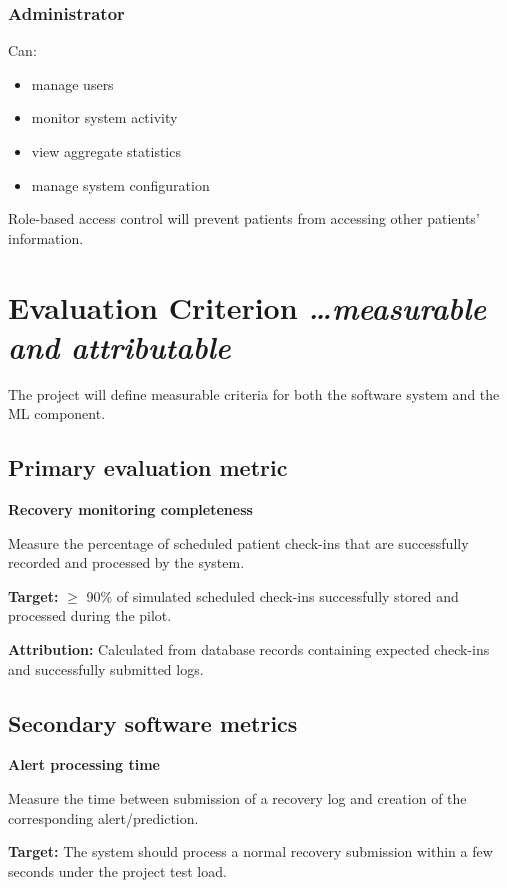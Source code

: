 \documentclass[11pt,a4paper]{article}
\newcommand{\BvrHint}[1]{%
  {\normalfont\normalsize\itshape\hfill #1}}
\begin{document}
\subsubsection{Administrator}

Can:
\begin{itemize}[leftmargin=0.7cm]
    \item manage users
    \item monitor system activity
    \item view aggregate statistics
    \item manage system configuration
\end{itemize}

Role-based access control will prevent patients from
accessing other patients' information.

\section{Evaluation Criterion %
\BvrHint{\ldots measurable and attributable}}

The project will define measurable criteria for both the
software system and the ML component.

\subsection{Primary evaluation metric}

\textbf{Recovery monitoring completeness}

Measure the percentage of scheduled patient check-ins that
are successfully recorded and processed by the system.

\textbf{Target:}
$\ge$ 90\% of simulated scheduled check-ins successfully stored
and processed during the pilot.

\textbf{Attribution:}
Calculated from database records containing expected
check-ins and successfully submitted logs.

\subsection{Secondary software metrics}

\textbf{Alert processing time}

Measure the time between submission of a recovery log and
creation of the corresponding alert/prediction.

\textbf{Target:} The system should process a normal recovery submission within
a few seconds under the project test load.
\end{document}
